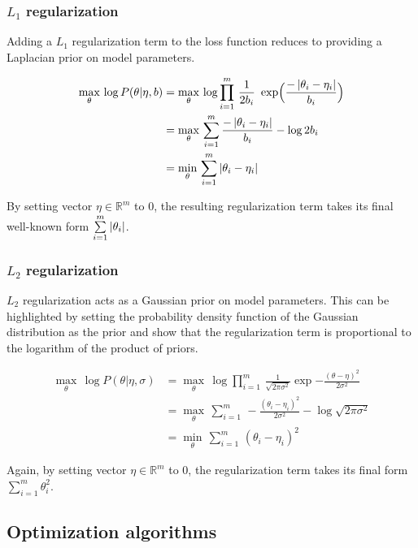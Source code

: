 	\subsubsection{$L_1$ regularization}

	   Adding a $L_1$ regularization term to the loss function reduces to providing a Laplacian
	   prior on model parameters.

	   \begin{align}
	       \max_{\theta}\, \log{P(\theta \vert \eta, b)}
		   & = \max_{\theta}\, \log{\prod\limits_{i=1}^m \, \frac{1}{2b_i}\,
		   \text{ exp}\Big(\frac{- \left|\theta_i - \eta_i\right|}{b_i}\Big)} \\
		   & = \max_{\theta}\, \sum\limits_{i=1}^m \frac{- \left|\theta_i - \eta_i\right|}{b_i} - \log{2b_i} \\
		   & = \min_{\theta}\, \sum\limits_{i=1}^m \left|\theta_i - \eta_i\right|
	   \end{align}

	   By setting vector $\eta \in \mathbb{R}^m$ to $0$, the resulting regularization term
	   takes its final well-known form $\sum\limits_{i=1}^m \left|\theta_i\right|$.

	\subsubsection{$L_2$ regularization}

	   $L_2$ regularization acts as a Gaussian prior on model parameters.
	   This can be highlighted by setting the probability density function of the Gaussian
	   distribution as the prior and show that the regularization term is proportional
	   to the logarithm of the product of priors.

	   \begin{align}
               \max_{\theta}\, \log{P(\theta \vert \eta, \sigma)}
		   & = \max_{\theta}\, \log{\prod\limits_{i=1}^m \, \frac{1}{\sqrt{2\pi\sigma^2}}
		   \exp{-\frac{(\theta - \eta)^2}{2\sigma^2}}} \\
		   & = \max_{\theta}\, \sum\limits_{i=1}^m \, -\frac{(\theta_i - \eta_i)^2}{2\sigma^2}
		   - \log{\sqrt{2\pi\sigma^2}} \\
		   & = \min_{\theta}\, \sum\limits_{i=1}^m \, (\theta_i - \eta_i)^2
           \end{align}

	   Again, by setting vector $\eta \in \mathbb{R}^m$ to $0$, the regularization term takes its
	   final form $\sum\limits_{i=1}^m \theta_i^2$.

    \subsection{Optimization algorithms}

